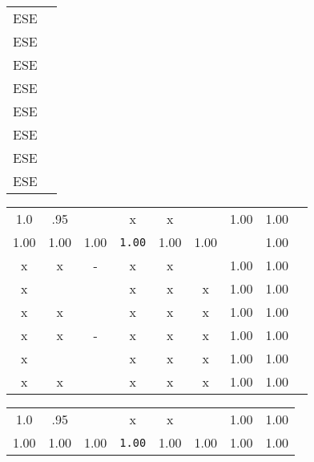 \begin{minipage}[c]{\textwidth}
		\vspace{4pt}
	\begin{minipage}[l]{\textwidth}
		\begin{minipage}[c]{0.09\textwidth}
		\end{minipage}
		\begin{minipage}[c]{0.03\textwidth}
			\tiny {
				\begin{tabular}{c>{\centering\arraybackslash} m{0pt}}
				ESE &\\
				ESE &\\
				ESE &\\
				ESE &\\
				ESE &\\
				ESE &\\
				ESE &\\
				ESE &\\
				\end{tabular}
			}
		\end{minipage}	
		\begin{minipage}[l]{0.27\textwidth}
			\centering
			\tiny {
			\begin{tabular}{|c|c|c|c|c|c|c|c|>{\centering\arraybackslash} m{0pt}}\hline
			1.0 & .95 & &x &x & &{1.00} & {1.00} &\\ \cline{1-8}
			{1.00}&{1.00}&{1.00}& {\texttt{1.00}}& {1.00}&{1.00}& &{1.00}&  \\ \cline{1-8}
			x &x &- &x &x & &{1.00} & {1.00} & \\  \cline{1-8}
			x & & &x &x &x &{1.00} \cellcolor[gray]{0.5}& {1.00} &\\ \cline{1-8}
			x &x & &x &x &x &{1.00}& {1.00} &\\  \hline
			x &x &- &x &x &x &{1.00}& {1.00} &\\  \cline{1-8}
			x & & &x &x &x &{1.00} & {1.00}  &\\ \cline{1-8}
			x &x & &x &x &x &{1.00}& {1.00} &\\ \cline{1-8}
			\end{tabular}
			}
		\end{minipage}
		\begin{minipage}[l]{0.27\textwidth}
			\centering
			\tiny {
			\begin{tabular}{|c|c|c|c|c|c|c|c|}\cline{1-8}
			1.0 	& .95 & 	&x 			&x & 		&{1.00} & {1.00} \\ \cline{1-8}
			{1.00}&	{1.00}	&{1.00}	& {\texttt{1.00}}& {1.00}&{1.00}& {1.00}& {1.00}  \\ \cline{1-8}

\end{tabular}}
\end{minipage}
\end{minipage}
\end{minipage}
